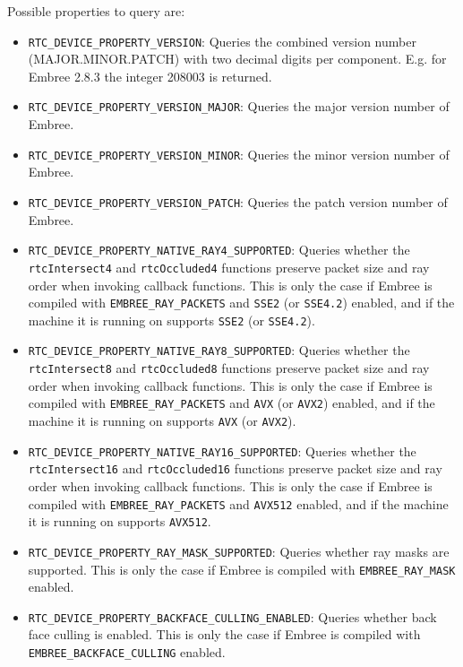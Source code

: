 Possible properties to query are:

\begin{itemize}
\item
  \texttt{RTC\_DEVICE\_PROPERTY\_VERSION}: Queries the combined version
  number (MAJOR.MINOR.PATCH) with two decimal digits per component. E.g.
  for Embree 2.8.3 the integer 208003 is returned.
\item
  \texttt{RTC\_DEVICE\_PROPERTY\_VERSION\_MAJOR}: Queries the major
  version number of Embree.
\item
  \texttt{RTC\_DEVICE\_PROPERTY\_VERSION\_MINOR}: Queries the minor
  version number of Embree.
\item
  \texttt{RTC\_DEVICE\_PROPERTY\_VERSION\_PATCH}: Queries the patch
  version number of Embree.
\item
  \texttt{RTC\_DEVICE\_PROPERTY\_NATIVE\_RAY4\_SUPPORTED}: Queries
  whether the \texttt{rtcIntersect4} and \texttt{rtcOccluded4} functions
  preserve packet size and ray order when invoking callback functions.
  This is only the case if Embree is compiled with
  \texttt{EMBREE\_RAY\_PACKETS} and \texttt{SSE2} (or \texttt{SSE4.2})
  enabled, and if the machine it is running on supports \texttt{SSE2}
  (or \texttt{SSE4.2}).
\item
  \texttt{RTC\_DEVICE\_PROPERTY\_NATIVE\_RAY8\_SUPPORTED}: Queries
  whether the \texttt{rtcIntersect8} and \texttt{rtcOccluded8} functions
  preserve packet size and ray order when invoking callback functions.
  This is only the case if Embree is compiled with
  \texttt{EMBREE\_RAY\_PACKETS} and \texttt{AVX} (or \texttt{AVX2})
  enabled, and if the machine it is running on supports \texttt{AVX} (or
  \texttt{AVX2}).
\item
  \texttt{RTC\_DEVICE\_PROPERTY\_NATIVE\_RAY16\_SUPPORTED}: Queries
  whether the \texttt{rtcIntersect16} and \texttt{rtcOccluded16}
  functions preserve packet size and ray order when invoking callback
  functions. This is only the case if Embree is compiled with
  \texttt{EMBREE\_RAY\_PACKETS} and \texttt{AVX512} enabled, and if the
  machine it is running on supports \texttt{AVX512}.
\item
  \texttt{RTC\_DEVICE\_PROPERTY\_RAY\_MASK\_SUPPORTED}: Queries whether
  ray masks are supported. This is only the case if Embree is compiled
  with \texttt{EMBREE\_RAY\_MASK} enabled.
\item
  \texttt{RTC\_DEVICE\_PROPERTY\_BACKFACE\_CULLING\_ENABLED}: Queries
  whether back face culling is enabled. This is only the case if Embree
  is compiled with \texttt{EMBREE\_BACKFACE\_CULLING} enabled.

\end{itemize}
